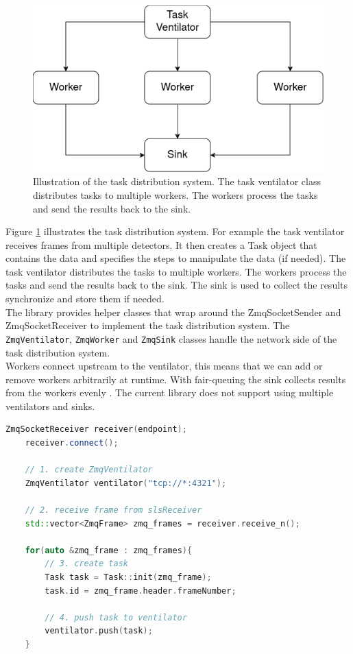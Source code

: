 \documentclass[./chapitre3.tex]{subfiles}
\begin{document}
\begin{figure}
    \centering
    \includegraphics[width=\textwidth]{Chapitre3/figures/task_distribution.png}
    \caption{Illustration of the task distribution system. The task ventilator class distributes
        tasks to multiple workers. The workers process the tasks and send the results back to the
        sink.}
    \label{fig:task_distribution}
\end{figure}

Figure \ref{fig:task_distribution} illustrates the task distribution system. For example the task
ventilator receives frames from multiple detectors. It then creates a Task object that contains
the data and specifies the steps to manipulate the data (if needed). The task ventilator
distributes the tasks to multiple workers. The workers process the tasks and send the results
back to the sink. The sink is used to collect the results synchronize and store them if needed.\\

The library provides helper classes that wrap around the ZmqSocketSender and ZmqSocketReceiver
to implement the task distribution system. The \lstinline|ZmqVentilator|, \lstinline|ZmqWorker|
and \lstinline|ZmqSink| classes handle the network side of the task distribution system.\\

Workers connect upstream to the ventilator, this means that we can add or
remove workers arbitrarily at runtime. With fair-queuing the sink collects
results from the workers evenly \cite{hintjens2013zeromq}. The current library
does not support using multiple ventilators and sinks.\\

\begin{lstlisting}[language=C++, caption=Example of a task ventilator, label=lst:task_ventilator]
    ZmqSocketReceiver receiver(endpoint);
    receiver.connect();

    // 1. create ZmqVentilator
    ZmqVentilator ventilator("tcp://*:4321");

    // 2. receive frame from slsReceiver
    std::vector<ZmqFrame> zmq_frames = receiver.receive_n();

    for(auto &zmq_frame : zmq_frames){
        // 3. create task
        Task task = Task::init(zmq_frame);
        task.id = zmq_frame.header.frameNumber;

        // 4. push task to ventilator
        ventilator.push(task);
    }
\end{lstlisting}
\end{document}
